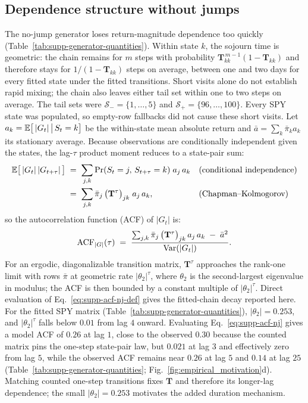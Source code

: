 \subsection{Dependence structure without jumps}
\label{sec:supp-gen-nojump}
\label{sec:supp-transitions}

The no-jump generator loses return-magnitude dependence too quickly (Table~\ref{tab:supp-generator-quantities}). Within state $k$, the sojourn time is geometric:
the chain remains for $m$ steps with probability
$\mathbf{T}_{kk}^{\,m-1} (1 - \mathbf{T}_{kk})$ and therefore stays
for $1/(1 - \mathbf{T}_{kk})$ steps on average, between one and two
days for every fitted state
under the fitted transitions. Short visits alone do not establish rapid mixing; the chain also leaves either tail set within one to two steps on average. The tail sets were $\mathcal{S}_{-}=\{1,\ldots,5\}$ and $\mathcal{S}_{+}=\{96,\ldots,100\}$. Every SPY state was populated, so empty-row fallbacks did not cause these short visits. Let $a_k =
\mathbb{E}\big[\,|G_t| \,\big|\, S_t = k\big]$ be the within-state mean
absolute return and $\bar a = \sum_k \bar\pi_k a_k$ its stationary
average. Because observations are conditionally independent given the
states, the lag-$\tau$ product moment reduces to a state-pair sum:
\begin{align}
  \mathbb{E}\big[\,|G_t|\, |G_{t+\tau}|\,\big]
   &\;=\; \sum_{j, k}
     \Pr(S_t = j,\, S_{t+\tau} = k)\; a_j\, a_k
     && \text{(conditional independence)} \notag \\
   &\;=\; \sum_{j, k} \bar\pi_j\,
     \big(\mathbf{T}^\tau\big)_{jk}\; a_j\, a_k,
     && \text{(Chapman--Kolmogorov)}
  \label{eq:supp-acf-nj}
\end{align}
so the autocorrelation function (ACF) of $|G_t|$ is:
\begin{equation}
  \mathrm{ACF}_{|G|}(\tau)
  \;=\; \frac{\sum_{j, k} \bar\pi_j\,
    \big(\mathbf{T}^\tau\big)_{jk}\, a_j\, a_k \;-\; \bar a^2}
    {\operatorname{Var}(|G_t|)}.
  \label{eq:supp-acf-nj-def}
\end{equation}
For an ergodic, diagonalizable transition matrix, $\mathbf{T}^\tau$ approaches the rank-one limit with rows $\bar\pi$ at geometric rate $|\theta_2|^\tau$, where $\theta_2$ is the second-largest eigenvalue in modulus; the ACF is then bounded by a constant multiple of $|\theta_2|^\tau$. Direct evaluation of Eq.~\eqref{eq:supp-acf-nj-def} gives the fitted-chain decay reported here. For the fitted SPY
matrix (Table~\ref{tab:supp-generator-quantities}), $|\theta_2| = 0.253$, and $|\theta_2|^\tau$ falls below
$0.01$ from lag $4$ onward. Evaluating Eq.~\eqref{eq:supp-acf-nj}
gives a model ACF of $0.26$ at lag $1$, close to the observed $0.30$
because the counted matrix pins the one-step state-pair law, but
$0.021$ at lag $3$ and effectively zero from lag $5$, while the
observed ACF remains near $0.26$ at lag $5$ and $0.14$ at lag $25$
(Table~\ref{tab:supp-generator-quantities};
Fig.~\ref{fig:empirical_motivation}d). Matching counted one-step transitions fixes $\mathbf{T}$ and therefore its longer-lag dependence; the small $|\theta_2| = 0.253$ motivates the added duration mechanism.


